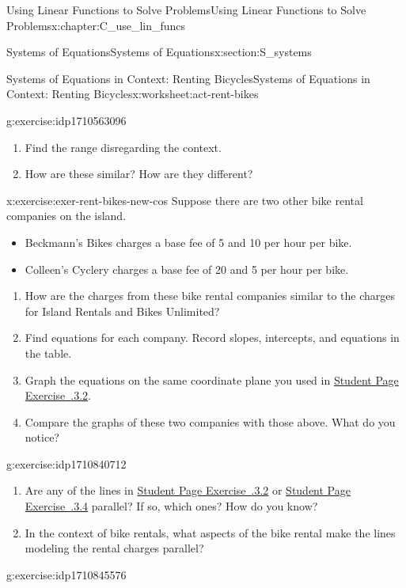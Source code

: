 \documentclass[oneside,10pt,]{book}
\newcommand{\xreffont}{\relax}
\numberwithin{equation}{chapter}
\begin{document}
\begin{chapterptx}{Using Linear Functions to Solve Problems}{}{Using Linear Functions to Solve Problems}{}{}{x:chapter:C_use_lin_funcs}
\begin{sectionptx}{Systems of Equations}{}{Systems of Equations}{}{}{x:section:S_systems}
\begin{worksheet-subsection}{Systems of Equations in Context: Renting Bicycles}{}{Systems of Equations in Context: Renting Bicycles}{}{}{x:worksheet:act-rent-bikes}
\begin{divisionexercise}{3}{}{}{g:exercise:idp1710563096}
\begin{enumerate}[font=\bfseries,label=(\alph*),ref=\alph*]
\item{}Find the range disregarding the context.%
\item{}How are these similar? How are they different?%
\end{enumerate}
\end{divisionexercise}%
\begin{divisionexercise}{4}{}{}{x:exercise:exer-rent-bikes-new-cos}%
Suppose there are two other bike rental companies on the island.%
\begin{itemize}[label=\textbullet]
\item{}Beckmann's Bikes charges a base fee of \textdollar{}5 and \textdollar{}10 per hour per bike.%
\item{}Colleen's Cyclery charges a base fee of \textdollar{}20 and \textdollar{}5 per hour per bike.%
\end{itemize}
%
\begin{enumerate}[font=\bfseries,label=(\alph*),ref=\alph*]
\item{}How are the charges from these bike rental companies similar to the charges for Island Rentals and Bikes Unlimited?%
\item{}Find equations for each company. Record slopes, intercepts, and equations in the table.%
\item{}Graph the equations on the same coordinate plane you used in \hyperlink{x:exercise:exer-rent-bikes-table}{Student Page Exercise~{\xreffont 3.5.3.2}}.%
\item{}Compare the graphs of these two companies with those above. What do you notice?%
\end{enumerate}
\end{divisionexercise}%
\begin{divisionexercise}{5}{}{}{g:exercise:idp1710840712}%
\begin{enumerate}[font=\bfseries,label=(\alph*),ref=\alph*]
\item{}Are any of the lines in \hyperlink{x:exercise:exer-rent-bikes-table}{Student Page Exercise~{\xreffont 3.5.3.2}} or \hyperlink{x:exercise:exer-rent-bikes-new-cos}{Student Page Exercise~{\xreffont 3.5.3.4}} parallel? If so, which ones? How do you know?%
\item{}In the context of bike rentals, what aspects of the bike rental make the lines modeling the rental charges parallel?%
\end{enumerate}
\end{divisionexercise}%
\begin{divisionexercise}{6}{}{}{g:exercise:idp1710845576}%

\end{divisionexercise}
\end{worksheet-subsection}
\end{sectionptx}
\end{chapterptx}
\end{document}
